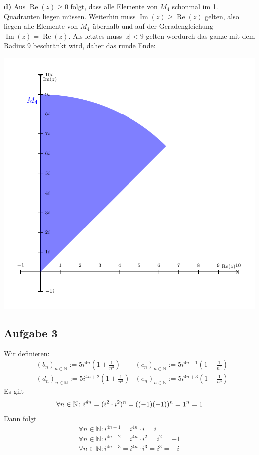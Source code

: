 \documentclass[a4paper,graphics,11pt]{article}
\newcommand{\aufgabe}[1]{\subsection*{Aufgabe #1}}
\newcommand{\re}{\operatorname{Re}}
\newcommand{\im}{\operatorname{Im}}
\begin{document}
\textbf{d)}
Aus $\re(z) \geq 0$ folgt, dass alle Elemente von $M_4$ schonmal im 1. Quadranten liegen
müssen. Weiterhin muss $\im(z) \geq \re(z)$ gelten, also liegen alle Elemente von $M_4$
überhalb und auf der Geradengleichung $\im(z) = \re(z)$. Als letztes muss $|z| < 9$ gelten
wordurch das ganze mit dem Radius 9 beschränkt wird, daher das runde Ende:\\
\strut\qquad\qquad\qquad\qquad\quad\includegraphics[scale=0.85]{graphics/graph4.pdf}
\newpage
\aufgabe{3}
Wir definieren:
\begin{align*}
    &(b_n)_{n\in \mathbb{N}} := 5i^{4n}\left(1+\frac{1}{n^3}\right)&
    (c_n)_{n\in \mathbb{N}} := 5i^{4n+1}\left(1+\frac{1}{n^3}\right)\\
    &(d_n)_{n\in \mathbb{N}} := 5i^{4n+2}\left(1+\frac{1}{n^3}\right) &
    (e_n)_{n\in \mathbb{N}} := 5i^{4n+3}\left(1+\frac{1}{n^3}\right)
\end{align*}
Es gilt
$$
    \forall n \in \mathbb{N}\colon i^{4n} = (i^2\cdot i^2)^n = ((-1)(-1))^n = 1^n = 1\\
$$
Dann folgt
\begin{align*}
    \forall n \in \mathbb{N}\colon i^{4n+1} = i^{4n} \cdot i = i\\
    \forall n \in \mathbb{N}\colon i^{4n+2} = i^{4n} \cdot i^2 = i^2 = -1\\
    \forall n \in \mathbb{N}\colon i^{4n+3} = i^{4n} \cdot i^3 = i^3 = -i
\end{align*}
\end{document}
